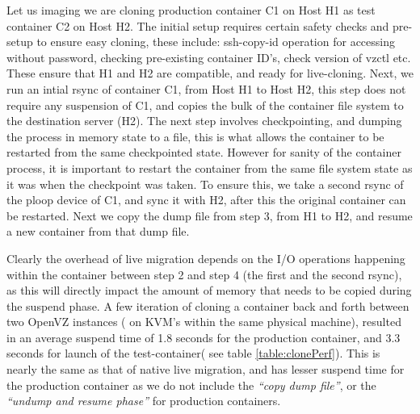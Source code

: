 Let us imaging we are cloning production container C1 on Host H1 as test container C2 on Host H2. 
The initial setup requires certain safety checks and pre-setup to ensure easy cloning, these include: ssh-copy-id operation for accessing without password, checking pre-existing container ID's, check version of vzctl etc. 
These ensure that H1 and H2 are compatible, and ready for live-cloning.
Next, we run an intial rsync of container C1, from Host H1 to Host H2, this step does not require any suspension of C1, and copies the bulk of the container file system to the destination server (H2). 
The next step involves checkpointing, and dumping the process in memory state to a file, this is what allows the container to be restarted from the same checkpointed state. 
However for sanity of the container process, it is important to restart the container from the same file system state as it was when the checkpoint was taken.
To ensure this, we take a second rsync of the ploop device of C1, and sync it with H2, after this the original container can be restarted.
Next we copy the dump file from step 3, from H1 to H2, and resume a new container from that dump file.

Clearly the overhead of live migration depends on the I/O operations happening within the container between step 2 and step 4 (the first and the second rsync), as this will directly impact the amount of memory that needs to be copied during the suspend phase. 
A few iteration of cloning a container back and forth between two OpenVZ instances ( on KVM's within the same physical machine), resulted in an average suspend time of 1.8 seconds for the production container, and 3.3 seconds for launch of the test-container( see table \ref{table:clonePerf}).
This is nearly the same as that of native live migration, and has lesser suspend time for the production container as we do not include the \textit{``copy dump file''}, or the \textit{``undump and resume phase''} for production containers. 


